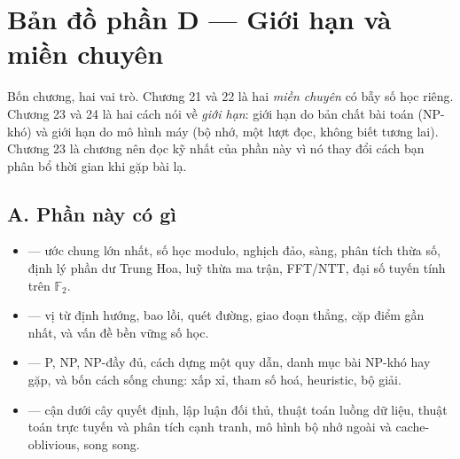 \documentclass[../algorithm.tex]{subfiles}
\begin{document}
\section*{Bản đồ phần D --- Giới hạn và miền chuyên}

\begin{tomtat}
Bốn chương, hai vai trò. Chương 21 và 22 là hai \emph{miền chuyên} có bẫy số học riêng. Chương 23 và 24 là hai cách nói về \emph{giới hạn}: giới hạn do bản chất bài toán (NP-khó) và giới hạn do mô hình máy (bộ nhớ, một lượt đọc, không biết tương lai). Chương 23 là chương nên đọc kỹ nhất của phần này vì nó thay đổi cách bạn phân bổ thời gian khi gặp bài lạ.
\end{tomtat}

\subsection*{A. Phần này có gì}
\begin{itemize}
\item \textbf{} --- ước chung lớn nhất, số học modulo, nghịch đảo, sàng, phân tích thừa số, định lý phần dư Trung Hoa, luỹ thừa ma trận, FFT/NTT, đại số tuyến tính trên \(\mathbb{F}_2\).
\item \textbf{} --- vị từ định hướng, bao lồi, quét đường, giao đoạn thẳng, cặp điểm gần nhất, và vấn đề bền vững số học.
\item \textbf{} --- P, NP, NP-đầy đủ, cách dựng một quy dẫn, danh mục bài NP-khó hay gặp, và bốn cách sống chung: xấp xỉ, tham số hoá, heuristic, bộ giải.
\item \textbf{} --- cận dưới cây quyết định, lập luận đối thủ, thuật toán luồng dữ liệu, thuật toán trực tuyến và phân tích cạnh tranh, mô hình bộ nhớ ngoài và cache-oblivious, song song.
\end{itemize}
\end{document}

